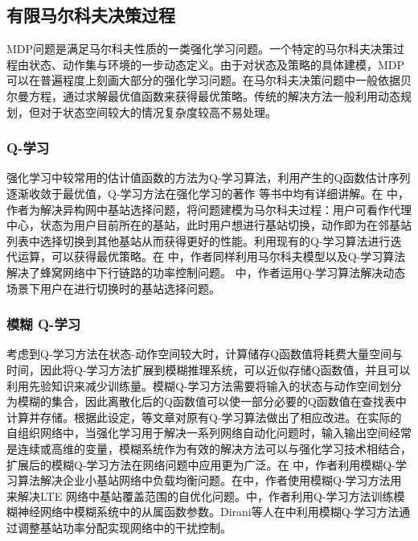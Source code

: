 \documentclass{IEEEtran}
\begin{document}



\subsection{有限马尔科夫决策过程}
MDP问题是满足马尔科夫性质的一类强化学习问题。一个特定的马尔科夫决策过程由状态、动作集与环境的一步动态定义。由于对状态及策略的具体建模，MDP可以在普遍程度上刻画大部分的强化学习问题。在马尔科夫决策问题中一般依据贝尔曼方程，通过求解最优值函数来获得最优策略。传统的解决方法一般利用动态规划，但对于状态空间较大的情况复杂度较高不易处理。

\subsubsection{Q-学习}
强化学习中较常用的估计值函数的方法为Q-学习算法，利用产生的Q函数估计序列逐渐收敛于最优值，Q-学习方法在强化学习的著作
\cite{Sutton2016}等书中均有详细讲解。在\cite{Simsek2015} 中，作者为解决异构网中基站选择问题，将问题建模为马尔科夫过程：用户可看作代理中心，状态为用户目前所在的基站，此时用户想进行基站切换，动作即为在邻基站列表中选择切换到其他基站从而获得更好的性能。利用现有的Q-学习算法进行迭代运算，可以获得最优策略。在
\cite{Ghadimi2017} 中，作者同样利用马尔科夫模型以及Q-学习算法解决了蜂窝网络中下行链路的功率控制问题。
\cite{Dhahri2012}中，作者运用Q-学习算法解决动态场景下用户在进行切换时的基站选择问题。

\subsubsection{模糊 Q-学习}
考虑到Q-学习方法在状态-动作空间较大时，计算储存Q函数值将耗费大量空间与时间，因此将Q-学习方法扩展到模糊推理系统，可以近似存储Q函数值，并且可以利用先验知识来减少训练量。模糊Q-学习方法需要将输入的状态与动作空间划分为模糊的集合，因此离散化后的Q函数值可以使一部分必要的Q函数值在查找表中计算并存储。根据此设定，\cite{Glorennec1997}等文章对原有Q-学习算法做出了相应改进。在实际的自组织网络中，当强化学习用于解决一系列网络自动化问题时，输入输出空间经常是连续或高维的变量，模糊系统作为有效的解决方法可以与强化学习技术相结合，扩展后的模糊Q-学习方法在网络问题中应用更为广泛。在
\cite{Munoz2013} 中，作者利用模糊Q-学习算法解决企业小基站网络中负载均衡问题。在\cite{Razavi2010}中，作者使用模糊Q-学习方法用来解决LTE 网络中基站覆盖范围的自优化问题。\cite{Fan2014}中，作者利用Q-学习方法训练模糊神经网络中模糊系统中的从属函数参数。Dirani等人在\cite{Dirani2010}中利用模糊Q-学习方法通过调整基站功率分配实现网络中的干扰控制。
\end{document}
